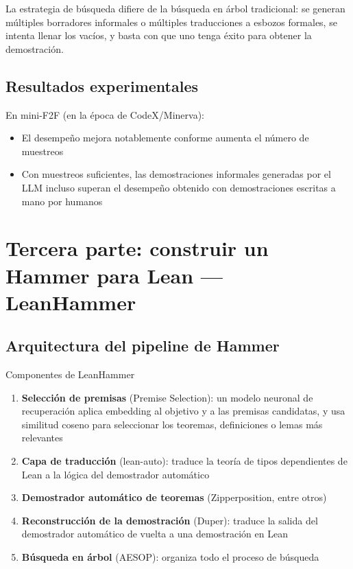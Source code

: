 \documentclass[a4paper]{article}
\begin{document}
La estrategia de búsqueda difiere de la búsqueda en árbol tradicional: se generan múltiples borradores informales o múltiples traducciones a esbozos formales, se intenta llenar los vacíos, y basta con que uno tenga éxito para obtener la demostración.

\subsection{Resultados experimentales}

En mini-F2F (en la época de CodeX/Minerva):
\begin{itemize}
    \item El desempeño mejora notablemente conforme aumenta el número de muestreos
    \item Con muestreos suficientes, las demostraciones informales generadas por el LLM incluso superan el desempeño obtenido con demostraciones escritas a mano por humanos
\end{itemize}

\section{Tercera parte: construir un Hammer para Lean --- LeanHammer}

\subsection{Arquitectura del pipeline de Hammer}

\begin{importantbox}{Componentes de LeanHammer}
\begin{enumerate}
    \item \textbf{Selección de premisas} (Premise Selection): un modelo neuronal de recuperación aplica embedding al objetivo y a las premisas candidatas, y usa similitud coseno para seleccionar los teoremas, definiciones o lemas más relevantes
    \item \textbf{Capa de traducción} (lean-auto): traduce la teoría de tipos dependientes de Lean a la lógica del demostrador automático
    \item \textbf{Demostrador automático de teoremas} (Zipperposition, entre otros)
    \item \textbf{Reconstrucción de la demostración} (Duper): traduce la salida del demostrador automático de vuelta a una demostración en Lean
    \item \textbf{Búsqueda en árbol} (AESOP): organiza todo el proceso de búsqueda
\end{enumerate}
\end{importantbox}
\end{document}
